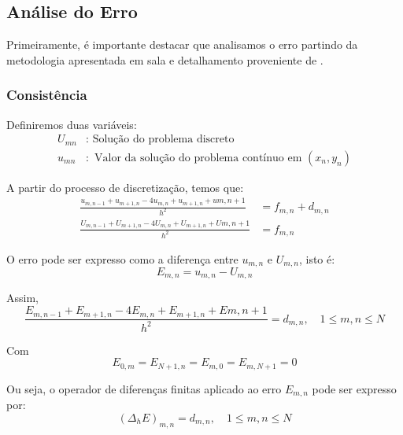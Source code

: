 \documentclass[column,amsmath,amssymb,floatfix]{revtex4}
\begin{document}
        
        \subsection{Análise do Erro}
                Primeiramente, é importante destacar que analisamos o erro partindo da metodologia apresentada em sala \cite{Kuhl2024} e detalhamento proveniente de \cite{Chen2014}.
                
            \subsubsection{Consistência}
                Definiremos duas variáveis:
                \begin{align*}
                    U_{mn} &: \text{ Solução do problema discreto}\\
                    u_{mn} &: \text{ Valor da solução do problema contínuo em $(x_n, y_n)$}
                \end{align*}
    
                A partir do processo de discretização, temos que:
                \begin{align*}
                    \frac{u_{m, n-1} + u_{m+1, n} - 4u_{m, n} + u_{m+1, n} + u{m, n+1}}{h^2} &= f_{m,n} + d_{m,n}\\
                    \frac{U_{m, n-1} + U_{m+1, n} - 4U_{m, n} + U_{m+1, n} + U{m, n+1}}{h^2} &= f_{m,n}
                \end{align*}
    
                O erro pode ser expresso como a diferença entre $u_{m,n}$ e $U_{m,n}$, isto é:
                \begin{equation*}
                    E_{m,n} = u_{m,n} - U_{m,n}
                \end{equation*}
    
                Assim, 
                \begin{equation*}
                    \frac{E_{m, n-1} + E_{m+1, n} - 4E_{m, n} + E_{m+1, n} + E{m, n+1}}{h^2} = d_{m,n}, \quad 1 \leq m, n \leq N
                \end{equation*}
    
                Com
                \begin{equation*}
                    E_{0,m} = E_{N+1, n} = E_{m, 0} = E_{m, N+1} = 0
                \end{equation*}
    
                Ou seja, o operador de diferenças finitas aplicado ao erro $E_{m,n}$ pode ser expresso por: 
                \begin{equation*}
                    \left(\Delta_h E \right)_{m,n} = d_{m, n}, \quad 1 \leq m, n \leq N 
                \end{equation*}
    
\end{document}
